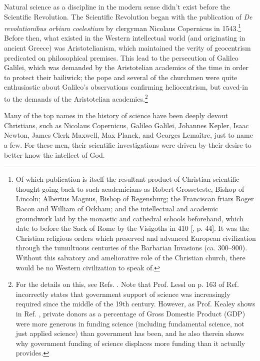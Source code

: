 \documentclass[letterpaper,12pt]{article}
\begin{document}
Natural science as a discipline in the modern sense didn't exist before the Scientific Revolution. The Scientific Revolution began with the publication of \emph{De revolutionibus orbium coelestium} by clergyman Nicolaus Copernicus in 1543.\footnote{\label{foot:ScientificThought}Of which publication is itself the resultant product of Christian scientific thought going back to such academicians as Robert Grosseteste, Bishop of Lincoln; Albertus Magnus, Bishop of Regensburg; the Franciscan friars Roger Bacon and William of Ockham; and the intellectual and academic groundwork laid by the monastic and cathedral schools beforehand, which date to before the Sack of Rome by the Visigoths in 410 [, p. 44]. It was the Christian religious orders which preserved and advanced European civilization through the tumultuous centuries of the Barbarian Invasions (ca. 300--900). Without this salvatory and ameliorative role of the Christian church, there would be no Western civilization to speak of.} Before then, what existed in the Western intellectual world (and originating in ancient Greece) was Aristotelianism, which maintained the verity of geocentrism predicated on philosophical premises. This lead to the persecution of Galileo Galilei, which was demanded by the Aristotelian academics of the time in order to protect their bailiwick; the pope and several of the churchmen were quite enthusiastic about Galileo's observations confirming heliocentrism, but caved-in to the demands of the Aristotelian academics.\footnote{For the details on this, see Refs. . Note that Prof. Lessl on p. 163 of Ref.  incorrectly states that government support of science was increasingly required since the middle of the 19th century. However, as Prof. Kealey shows in Ref. , private donors as a percentage of Gross Domestic Product (GDP) were more generous in funding science (including fundamental science, not just applied science) than government has been, and he also therein shows why government funding of science displaces more funding than it actually provides.}

Many of the top names in the history of science have been deeply devout Christians, such as Nicolaus Copernicus, Galileo Galilei, Johannes Kepler, Isaac Newton, James Clerk Maxwell, Max Planck, and Georges Lema\^{i}tre, just to name a few. For these men, their scientific investigations were driven by their desire to better know the intellect of God.
\end{document}
